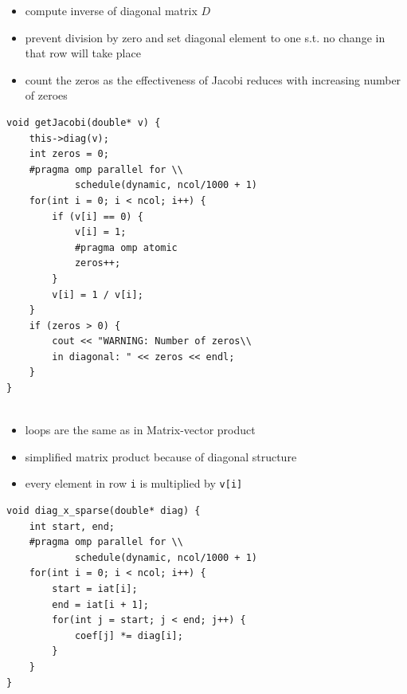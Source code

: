 \documentclass{article}
\begin{document}
\begin{minipage}[t]{0.45\textwidth}
\begin{itemize}
    \item compute inverse of diagonal matrix $D$
    \item prevent division by zero and set diagonal element to one s.t. no change in that row will take place
    \item count the zeros as the effectiveness of Jacobi reduces with increasing number of zeroes
\end{itemize}
\end{minipage}
\hspace{0.7cm}
\begin{minipage}[t]{0.35\textwidth}
\begin{verbatim}
void getJacobi(double* v) {
    this->diag(v);
    int zeros = 0;
    #pragma omp parallel for \\
            schedule(dynamic, ncol/1000 + 1)
    for(int i = 0; i < ncol; i++) {
        if (v[i] == 0) {
            v[i] = 1;
            #pragma omp atomic
            zeros++;
        }
        v[i] = 1 / v[i];
    }
    if (zeros > 0) {
        cout << "WARNING: Number of zeros\\
        in diagonal: " << zeros << endl;
    }
}


\end{verbatim}
\end{minipage}

\begin{minipage}[t]{0.45\textwidth}
\begin{itemize}
    \item loops are the same as in Matrix-vector product
    \item simplified matrix product because of diagonal structure
    \item every element in row \lstinline|i| is multiplied by \lstinline|v[i]|
\end{itemize}
\end{minipage}
\hspace{0.7cm}
\begin{minipage}[t]{0.35\textwidth}
\begin{verbatim}
void diag_x_sparse(double* diag) {
    int start, end;
    #pragma omp parallel for \\
            schedule(dynamic, ncol/1000 + 1)
    for(int i = 0; i < ncol; i++) {
        start = iat[i];
        end = iat[i + 1];
        for(int j = start; j < end; j++) {
            coef[j] *= diag[i]; 
        }
    }
}


\end{verbatim}
\end{minipage}
\end{document}
